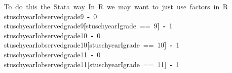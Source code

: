 \documentclass[12pt]{article}
\makeatletter
\newcommand{\hlnumber}[1]{\textcolor[rgb]{0,0,0}{#1}}%
\newcommand{\hlkeyword}[1]{\textcolor[rgb]{0,0,0}{\textbf{#1}}}%
\newcommand{\hlcomment}[1]{\textcolor[rgb]{0.180392156862745,0.6,0.341176470588235}{#1}}%
\newcommand{\hlassignement}[1]{\textcolor[rgb]{0,0,0}{\textbf{#1}}}%
\newcommand{\hlsymbol}[1]{\textcolor[rgb]{0,0,0}{#1}}%
\newcommand{\hlstd}[1]{\textcolor[rgb]{0,0,0}{#1}}%
\newenvironment{kframe}{%
 \def\FrameCommand##1{\hskip\@totalleftmargin \hskip-\fboxsep
 \colorbox{shadecolor}{##1}\hskip-\fboxsep
     \hskip-\linewidth \hskip-\@totalleftmargin \hskip\columnwidth}%
 \MakeFramed {\advance\hsize-\width
   \@totalleftmargin\z@ \linewidth\hsize
   \@setminipage}}%
 {\par\unskip\endMakeFramed}
\newenvironment{knitrout}{}{} %
\renewenvironment{knitrout}{\begin{footnotesize}}{\end{footnotesize}}
\makeatother
\begin{document}
\begin{knitrout}
\color{fgcolor}\begin{kframe}
\begin{flushleft}
\ttfamily\noindent
\hlcomment{\usebox{\hlnormalsizeboxhash}{\ }To{\ }do{\ }this{\ }the{\ }Stata{\ }way{\ }In{\ }R{\ }we{\ }may{\ }want{\ }to{\ }just{\ }use{\ }factors{\ }in{\ }R}\hspace*{\fill}\\
\hlstd{}\hlsymbol{stuschyearI}\hlkeyword{\usebox{\hlnormalsizeboxdollar}}\hlsymbol{observed\usebox{\hlnormalsizeboxunderscore}grade\usebox{\hlnormalsizeboxunderscore}9}{\ }\hlassignement{\usebox{\hlnormalsizeboxlessthan}-}{\ }\hlnumber{0}\hspace*{\fill}\\
\hlstd{}\hlsymbol{stuschyearI}\hlkeyword{\usebox{\hlnormalsizeboxdollar}}\hlsymbol{observed\usebox{\hlnormalsizeboxunderscore}grade\usebox{\hlnormalsizeboxunderscore}9}\hlkeyword{[}\hlsymbol{stuschyearI}\hlkeyword{\usebox{\hlnormalsizeboxdollar}}\hlsymbol{grade}{\ }=={\ }\hlnumber{9}\hlkeyword{]}{\ }\hlassignement{\usebox{\hlnormalsizeboxlessthan}-}{\ }\hlnumber{1}\hspace*{\fill}\\
\hlstd{}\hlsymbol{stuschyearI}\hlkeyword{\usebox{\hlnormalsizeboxdollar}}\hlsymbol{observed\usebox{\hlnormalsizeboxunderscore}grade\usebox{\hlnormalsizeboxunderscore}10}{\ }\hlassignement{\usebox{\hlnormalsizeboxlessthan}-}{\ }\hlnumber{0}\hspace*{\fill}\\
\hlstd{}\hlsymbol{stuschyearI}\hlkeyword{\usebox{\hlnormalsizeboxdollar}}\hlsymbol{observed\usebox{\hlnormalsizeboxunderscore}grade\usebox{\hlnormalsizeboxunderscore}10}\hlkeyword{[}\hlsymbol{stuschyearI}\hlkeyword{\usebox{\hlnormalsizeboxdollar}}\hlsymbol{grade}{\ }=={\ }\hlnumber{10}\hlkeyword{]}{\ }\hlassignement{\usebox{\hlnormalsizeboxlessthan}-}{\ }\hlnumber{1}\hspace*{\fill}\\
\hlstd{}\hlsymbol{stuschyearI}\hlkeyword{\usebox{\hlnormalsizeboxdollar}}\hlsymbol{observed\usebox{\hlnormalsizeboxunderscore}grade\usebox{\hlnormalsizeboxunderscore}11}{\ }\hlassignement{\usebox{\hlnormalsizeboxlessthan}-}{\ }\hlnumber{0}\hspace*{\fill}\\
\hlstd{}\hlsymbol{stuschyearI}\hlkeyword{\usebox{\hlnormalsizeboxdollar}}\hlsymbol{observed\usebox{\hlnormalsizeboxunderscore}grade\usebox{\hlnormalsizeboxunderscore}11}\hlkeyword{[}\hlsymbol{stuschyearI}\hlkeyword{\usebox{\hlnormalsizeboxdollar}}\hlsymbol{grade}{\ }=={\ }\hlnumber{11}\hlkeyword{]}{\ }\hlassignement{\usebox{\hlnormalsizeboxlessthan}-}{\ }\hlnumber{1}\hspace*{\fill}\\

\end{flushleft}
\end{kframe}
\end{knitrout}
\end{document}
